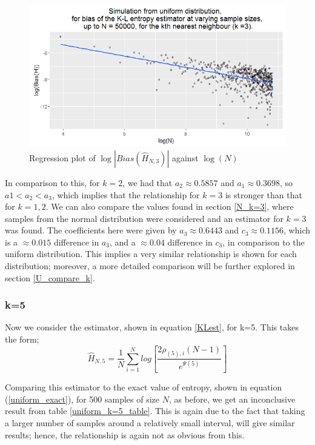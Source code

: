\documentclass{article}
\begin{document}
\begin{figure}
  \begin{center}
    \includegraphics[width=\textwidth]{./Graphs/Uniform_k=3_plot.png}
  \end{center}
\caption{Regression plot of $\log|Bias(\hat{H}_{N, 3})|$ against $\log(N)$}
  \label{uniform_k=3_graph}
\end{figure}

In comparison to this, for $k=2$, we had that $a_{2} \approx 0.5857$ and $a_{1} \approx 0.3698$, so $a{1} < a_{2} < a_{3}$, which implies that the relationship for $k=3$ is stronger than that for $k=1, 2$. We can also compare the values found in section \ref{N_k=3}, where samples from the normal distribution were considered and an estimator for $k=3$ was found. The coefficients here were given by $a_{3} \approx 0.6443$ and $c_{3} \approx 0.1156$, which is a $\approx 0.015$ difference in $a_{3}$, and a $\approx 0.04$ difference in $c_{3}$, in comparison to the uniform distribution. This implies a very similar relationship is shown for each distribution; moreover, a more detailed comparison will be further explored in section \ref{U_compare_k}.





\subsubsection{k=5} \label{U_k=5}
Now we consider the estimator, shown in equation \ref{KLest}, for k=5. This takes the form;
\begin{equation}
\hat{H}_{N, 5} = \frac{1}{N} \sum_{i=1}^{N} log \left[ \frac{2\rho_{(5),i}(N-1)}{e^{\Psi(5)}} \right] \nonumber
\end{equation}

Comparing this estimator to the exact value of entropy, shown in equation (\ref{uniform_exact}), for 500 samples of size $N$, as before, we get an inconclusive result from table \ref{uniform_k=5_table}. This is again due to the fact that taking a larger number of samples around a relatively small interval, will give similar results; hence, the relationship is again not as obvious from this. 
\end{document}
